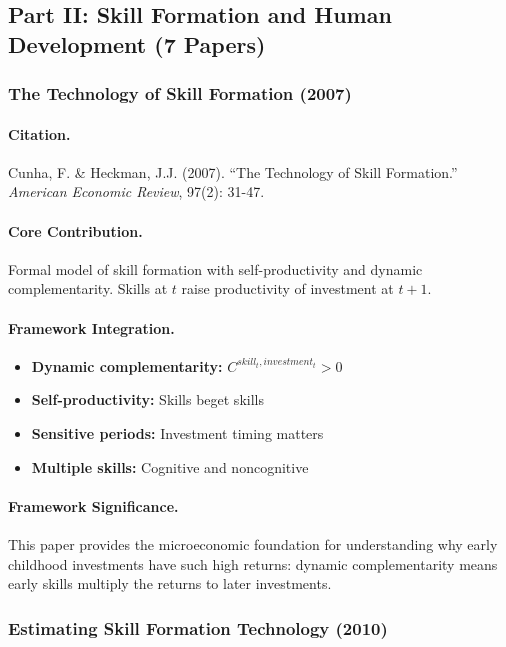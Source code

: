 \documentclass[12pt,a4paper]{article}
\begin{document}
\subsection{Part II: Skill Formation and Human Development (7 Papers)}

\subsubsection{The Technology of Skill Formation (2007)}

\paragraph{Citation.}
Cunha, F. \& Heckman, J.J. (2007). ``The Technology of Skill Formation.''
\emph{American Economic Review}, 97(2): 31-47.

\paragraph{Core Contribution.}
Formal model of skill formation with self-productivity and dynamic
complementarity. Skills at $t$ raise productivity of investment at $t+1$.

\paragraph{Framework Integration.}
\begin{itemize}
  \item \textbf{Dynamic complementarity:} $C^{skill_t, investment_t} > 0$
  \item \textbf{Self-productivity:} Skills beget skills
  \item \textbf{Sensitive periods:} Investment timing matters
  \item \textbf{Multiple skills:} Cognitive and noncognitive
\end{itemize}

\paragraph{Framework Significance.}
This paper provides the microeconomic foundation for understanding why
early childhood investments have such high returns: dynamic complementarity
means early skills multiply the returns to later investments.

\subsubsection{Estimating Skill Formation Technology (2010)}
\end{document}
